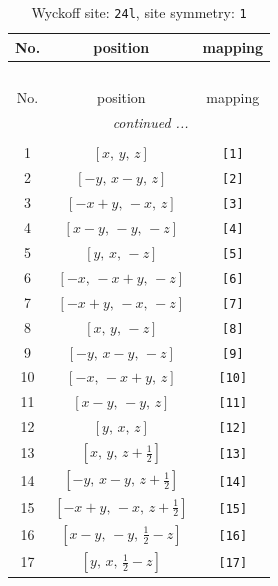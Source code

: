 \documentclass[fleqn,8pt]{jsarticle}
\begin{document}
\begin{longtable}{ccc}
\caption{Wyckoff site: {\tt 24l}, site symmetry: {\tt 1}}
 \\
 \hline \hline
No. & position & mapping \\ \hline \endfirsthead

\multicolumn{2}{l}{\tablename\ \thetable{}} \\
 \hline \hline
No. & position & mapping \\ \hline \endhead

 \hline \hline
\multicolumn{2}{r}{\footnotesize\it continued ...} \\ \endfoot

 \hline \hline
\multicolumn{2}{r}{} \\ \endlastfoot

1 & $\left[ x,\, y,\, z \right]$ & {\tt [1]} \\ \hline
2 & $\left[ - y,\, x - y,\, z \right]$ & {\tt [2]} \\ \hline
3 & $\left[ - x + y,\, - x,\, z \right]$ & {\tt [3]} \\ \hline
4 & $\left[ x - y,\, - y,\, - z \right]$ & {\tt [4]} \\ \hline
5 & $\left[ y,\, x,\, - z \right]$ & {\tt [5]} \\ \hline
6 & $\left[ - x,\, - x + y,\, - z \right]$ & {\tt [6]} \\ \hline
7 & $\left[ - x + y,\, - x,\, - z \right]$ & {\tt [7]} \\ \hline
8 & $\left[ x,\, y,\, - z \right]$ & {\tt [8]} \\ \hline
9 & $\left[ - y,\, x - y,\, - z \right]$ & {\tt [9]} \\ \hline
10 & $\left[ - x,\, - x + y,\, z \right]$ & {\tt [10]} \\ \hline
11 & $\left[ x - y,\, - y,\, z \right]$ & {\tt [11]} \\ \hline
12 & $\left[ y,\, x,\, z \right]$ & {\tt [12]} \\ \hline
13 & $\left[ x,\, y,\, z + \frac{1}{2} \right]$ & {\tt [13]} \\ \hline
14 & $\left[ - y,\, x - y,\, z + \frac{1}{2} \right]$ & {\tt [14]} \\ \hline
15 & $\left[ - x + y,\, - x,\, z + \frac{1}{2} \right]$ & {\tt [15]} \\ \hline
16 & $\left[ x - y,\, - y,\, \frac{1}{2} - z \right]$ & {\tt [16]} \\ \hline
17 & $\left[ y,\, x,\, \frac{1}{2} - z \right]$ & {\tt [17]} \\ \hline

\end{longtable}
\end{document}
